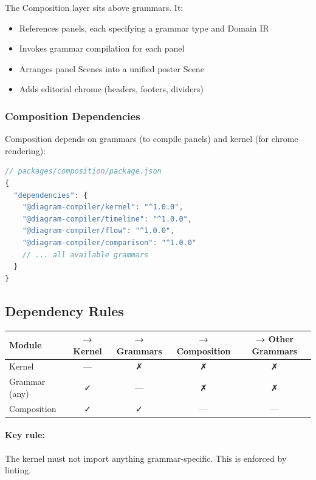 The Composition layer sits above grammars. It:

\begin{itemize}
  \item References panels, each specifying a grammar type and Domain IR
  \item Invokes grammar compilation for each panel
  \item Arranges panel Scenes into a unified poster Scene
  \item Adds editorial chrome (headers, footers, dividers)
\end{itemize}

\subsubsection{Composition Dependencies}

Composition depends on grammars (to compile panels) and kernel (for chrome rendering):

\begin{lstlisting}[language=javascript,caption={Composition dependency structure}]
// packages/composition/package.json
{
  "dependencies": {
    "@diagram-compiler/kernel": "^1.0.0",
    "@diagram-compiler/timeline": "^1.0.0",
    "@diagram-compiler/flow": "^1.0.0",
    "@diagram-compiler/comparison": "^1.0.0"
    // ... all available grammars
  }
}
\end{lstlisting}

\subsection{Dependency Rules}

\begin{center}
\small
\begin{tabular}{lcccc}
\toprule
\textbf{Module} & \textbf{→ Kernel} & \textbf{→ Grammars} & \textbf{→ Composition} & \textbf{→ Other Grammars} \\
\midrule
Kernel & — & ✗ & ✗ & ✗ \\
Grammar (any) & ✓ & — & ✗ & ✗ \\
Composition & ✓ & ✓ & — & — \\
\bottomrule
\end{tabular}
\end{center}

\paragraph{Key rule:} The kernel must not import anything grammar-specific. This is enforced by linting.

